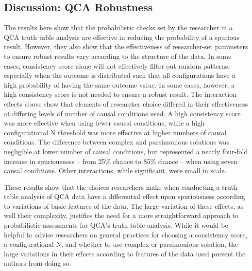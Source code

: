 \documentclass[12pt]{article}
\begin{document}
{%

\subsection{Discussion: QCA Robustness}

The results here show that the probabilistic checks set by the researcher in a QCA truth table analysis are effective in reducing the probability of a spurious result. However, they also show that the effectiveness of researcher-set parameters to ensure robust results vary according to the structure of the data. In some cases, consistency score alone will not effectively filter out random patterns, especially when the outcome is distributed such that all configurations have a high probability of having the same outcome value. In some cases, however, a high consistency score is not needed to ensure a robust result. The interaction effects above show that elements of researcher choice differed in their effectiveness at differing levels of number of causal conditions used. A high consistency score was more effective when using fewer causal conditions, while a high configurational N threshold was more effective at higher numbers of causal conditions. The difference between complex and parsimonious solutions was negligible at lower number of causal conditions, but represented a nearly four-fold increase in spuriousness -- from 25\% chance to 85\% chance -- when using seven causal conditions. Other interactions, while significant, were small in scale.

These results show that the choices researchers make when conducting a truth table analysis of QCA data have a differential effect upon spuriousness according to variations of basic features of the data. The large variation of these effects, as well their complexity, justifies the need for a more straightforward approach to probabilistic assessments for QCA's truth table analysis. While it would be helpful to advise researchers on general practices for choosing a consistency score, a configurational N, and whether to use complex or parsimonious solution, the large variations in their effects according to features of the data used prevent the authors from doing so. 


\newpage

}
\end{document}
